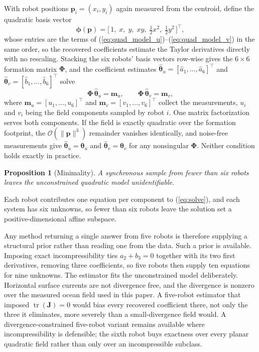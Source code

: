 \documentclass[lettersize,journal]{IEEEtran}
\newtheorem{proposition}{Proposition}
\begin{document}
With robot positions $\mathbf{p}_i = (x_i, y_i)$ again measured from the
centroid, define the quadratic basis vector
\begin{equation}
    \boldsymbol{\phi}(\mathbf{p}) =
    \bigl[\,1, \; x, \; y, \; xy, \;
    \tfrac{1}{2}x^2, \; \tfrac{1}{2}y^2\,\bigr]^\top,
\end{equation}
whose entries are the terms of
(\ref{eq:quad_model_u})--(\ref{eq:quad_model_v}) in the same order, so
the recovered coefficients estimate the Taylor derivatives directly with
no rescaling. Stacking the six robots' basis vectors row-wise gives
the $6 \times 6$ formation matrix $\boldsymbol{\Phi}$, and the coefficient
estimates $\hat{\boldsymbol{\theta}}_u = [\hat{a}_1, \ldots,
\hat{a}_6]^\top$ and $\hat{\boldsymbol{\theta}}_v = [\hat{b}_1, \ldots,
\hat{b}_6]^\top$ solve
\begin{equation}
    \boldsymbol{\Phi}\,\hat{\boldsymbol{\theta}}_u = \mathbf{m}_u, \qquad
    \boldsymbol{\Phi}\,\hat{\boldsymbol{\theta}}_v = \mathbf{m}_v,
    \label{eq:solve}
\end{equation}
where $\mathbf{m}_u = [u_1, \ldots, u_6]^\top$ and
$\mathbf{m}_v = [v_1, \ldots, v_6]^\top$ collect the measurements, $u_i$
and $v_i$ being the field components sampled by robot $i$. One matrix
factorization serves both components. If the field is exactly quadratic
over the formation footprint, the $\mathcal{O}(\|\mathbf{p}\|^3)$
remainder vanishes identically, and noise-free measurements give
$\hat{\boldsymbol{\theta}}_u = \boldsymbol{\theta}_u$ and
$\hat{\boldsymbol{\theta}}_v = \boldsymbol{\theta}_v$ for any nonsingular
$\boldsymbol{\Phi}$. Neither condition holds exactly in practice.

\begin{proposition}[Minimality]
\label{prop:minimality}
A synchronous sample from fewer than six robots leaves the
unconstrained quadratic model unidentifiable.
\end{proposition}

\begin{IEEEproof}
Each robot contributes one equation per component to (\ref{eq:solve}),
and each system has six unknowns, so fewer than six robots leave the
solution set a positive-dimensional affine subspace.
\end{IEEEproof}

Any method returning a single answer from five robots is therefore
supplying a structural prior rather than reading one from the data. Such
a prior is available. Imposing exact incompressibility ties $a_2 + b_3 =
0$ together with its two first derivatives, removing three coefficients,
so five robots then supply ten equations for nine unknowns. The
estimator fits the unconstrained model deliberately. Horizontal surface
currents are not divergence free, and the divergence is nonzero over the
measured ocean field used in this paper. A five-robot estimator
that imposed $\operatorname{tr}(\mathbf{J}) = 0$ would bias every
recovered coefficient there, not only the three it eliminates, more
severely than a small-divergence field would. A divergence-constrained
five-robot variant remains available where incompressibility is
defensible; the sixth robot buys exactness over every planar quadratic
field rather than only over an incompressible subclass.
\end{document}
